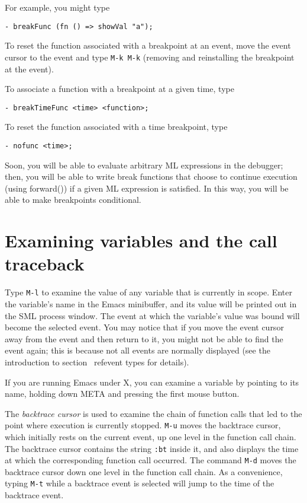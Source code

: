 For example, you might type

\begin{verbatim}
- breakFunc (fn () => showVal "a");
\end{verbatim}

To reset the function associated with a breakpoint at an event, move
the event cursor to the event and type \verb'M-k M-k' (removing and
reinstalling the breakpoint at the event).

To associate a function with a breakpoint at a given time, type

\begin{verbatim}
- breakTimeFunc <time> <function>;
\end{verbatim}
To reset the function associated with a time breakpoint, type
\begin{verbatim}
- nofunc <time>;
\end{verbatim}

Soon, you will be able to evaluate arbitrary ML expressions in the
debugger; then, you will be able to write break functions that choose
to continue execution (using forward()) if a given ML expression is
satisfied.  In this way, you will be able to make breakpoints conditional.

\section{Examining variables and the call traceback}

Type \verb'M-l' to examine the value of any variable that is currently
in scope.  Enter the variable's name in the Emacs minibuffer, and its
value will be printed out in the SML process window.  The event at which the
variable's value was bound will become the selected event.  You may notice
that if you
move the event cursor away from the event and then return to it, you might
not be able to find the event again;
this is because not all events are normally
displayed (see the introduction to section ~ref{event types} for details).

If you are running Emacs under X, you can examine a variable by
pointing to its name, holding down META and pressing the first mouse button.

The {\em backtrace cursor} is used to examine the chain of function
calls that led to the point where execution is currently stopped.
\verb'M-u' moves the backtrace cursor, which initially rests on the current
event, up one level in the function call chain.  The
backtrace cursor contains the string \verb':bt' inside it, and also
displays the time at which the corresponding function call occurred.
The command \verb'M-d' moves the backtrace cursor down one level in
the function call chain.  As a convenience, typing \verb'M-t' while a
backtrace event is selected will jump to the time of the backtrace event.


